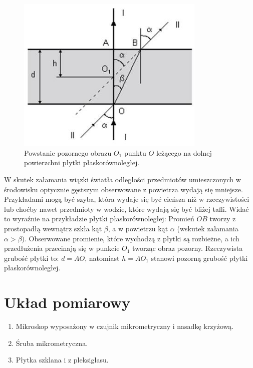 \documentclass[a4paper,11pt]{article}
\begin{document}
\begin{figure}[ht]
	\centering
	\includegraphics[width=90mm]{image006.jpg}
	\caption{Powstanie  pozornego  obrazu  $O_{1}$ punktu  $O$  leżącego  na  dolnej  powierzchni płytki płaskorównoległej. }
\end{figure}

\indent W skutek załamania wiązki światła odległości przedmiotów umieszczonych w środowisku optycznie gęstszym obserwowane z powietrza wydają się mniejsze. Przykładami mogą być szyba, która wydaje się być cieńsza niż w rzeczywistości lub choćby nawet przedmioty w wodzie, które wydają się być bliżej tafli. Widać to wyraźnie na przykładzie płytki płaskorównoległej:
Promień $OB$ tworzy z prostopadłą wewnątrz szkła kąt $\beta$, a w powietrzu kąt $\alpha$ (wskutek załamania $\alpha > \beta$). Obserwowane promienie, które wychodzą z płytki są rozbieżne, a ich przedłużenia przecinają się w punkcie $O_1$ tworząc obraz pozorny. Rzeczywista grubość płytki to: $d = AO$, natomiast $h = AO_1$ stanowi pozorną grubość płytki płaskorównoległej.


\section{Układ pomiarowy}
\begin{enumerate}
\item Mikroskop wyposażony w czujnik mikrometryczny i nasadkę krzyżową.
\item Śruba mikrometryczna. 
\item Płytka szklana i z pleksiglasu.
\end{enumerate}
\end{document}
